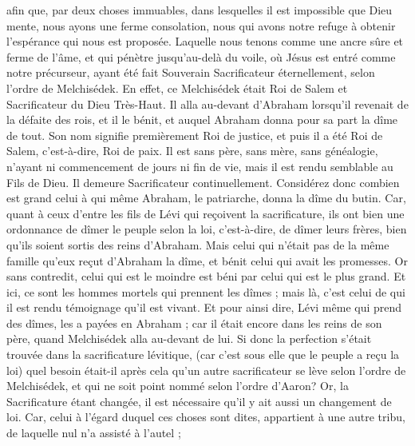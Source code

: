 \begin{multicols}{2}
afin que, par deux choses immuables, dans lesquelles il est impossible que Dieu mente, nous ayons une ferme consolation, nous qui avons notre refuge à obtenir l'espérance qui nous est proposée.
Laquelle nous tenons comme une ancre sûre et ferme de l'âme, et qui pénètre jusqu'au-delà du voile,
où Jésus est entré comme notre précurseur, ayant été fait Souverain Sacrificateur éternellement, selon l'ordre de Melchisédek.
\VerseOne{}En effet, ce Melchisédek était Roi de Salem et Sacrificateur du Dieu Très-Haut. Il alla au-devant d'Abraham lorsqu'il revenait de la défaite des rois, et il le bénit,
et auquel Abraham donna pour sa part la dîme de tout. Son nom signifie premièrement Roi de justice, et puis il a été Roi de Salem, c'est-à-dire, Roi de paix.
Il est sans père, sans mère, sans généalogie, n'ayant ni commencement de jours ni fin de vie, mais il est rendu semblable au Fils de Dieu. Il demeure Sacrificateur continuellement.
Considérez donc combien est grand celui à qui même Abraham, le patriarche, donna la dîme du butin.
Car, quant à ceux d'entre les fils de Lévi qui reçoivent la sacrificature, ils ont bien une ordonnance de dîmer le peuple selon la loi, c'est-à-dire, de dîmer leurs frères, bien qu'ils soient sortis des reins d'Abraham.
Mais celui qui n'était pas de la même famille qu'eux reçut d'Abraham la dîme, et bénit celui qui avait les promesses.
Or sans contredit, celui qui est le moindre est béni par celui qui est le plus grand.
Et ici, ce sont les hommes mortels qui prennent les dîmes ; mais là, c'est celui de qui il est rendu témoignage qu'il est vivant.
Et pour ainsi dire, Lévi même qui prend des dîmes, les a payées en Abraham ;
car il était encore dans les reins de son père, quand Melchisédek alla au-devant de lui.
Si donc la perfection s'était trouvée dans la sacrificature lévitique, (car c'est sous elle que le peuple a reçu la loi) quel besoin était-il après cela qu'un autre sacrificateur se lève selon l'ordre de Melchisédek, et qui ne soit point nommé selon l'ordre d'Aaron?
Or, la Sacrificature étant changée, il est nécessaire qu'il y ait aussi un changement de loi.
Car, celui à l'égard duquel ces choses sont dites, appartient à une autre tribu, de laquelle nul n'a assisté à l'autel ;

\end{multicols}
